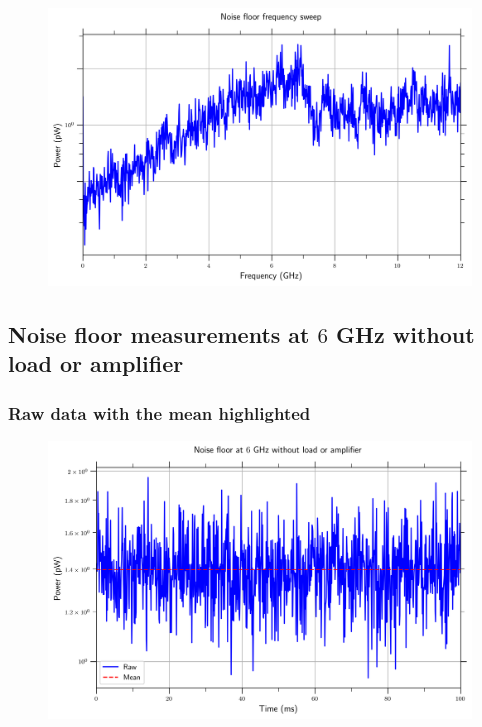 \documentclass[english,12pt,a4paper]{article}
\begin{document}
\begin{figure}[H]
	\includegraphics[width=1\linewidth]{Plots/noise_floor_sweep}
	\caption[Noise floor frequency sweep]{}
	\label{fig:noisefloorsweep}
\end{figure}

 

\hypertarget{noise-floor-measurements-at-6-ghz-without-load-or-amplifier}{%
	\subsection{\texorpdfstring{Noise floor measurements at \(6\) GHz without
			load or
			amplifier}{Noise floor measurements at 6 GHz without load or amplifier}}\label{noise-floor-measurements-at-6-ghz-without-load-or-amplifier}}

 

\hypertarget{raw-data-with-the-mean-highlighted}{%
	\subsubsection{Raw data with the mean
		highlighted}\label{raw-data-with-the-mean-highlighted_1}}

\begin{figure}[H]
	\includegraphics[width=1\linewidth]{Plots/noise_floor_6_GHz}
	\caption[Noise floor at 6 GHz]{}
	\label{fig:noisefloor6ghz}
\end{figure}
\end{document}
